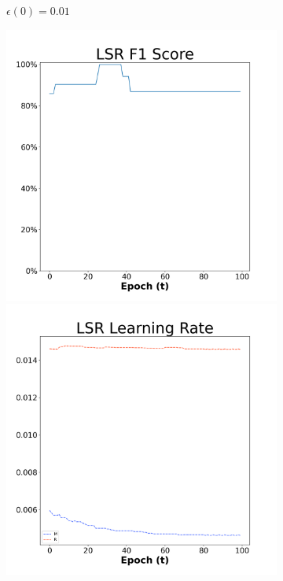\begin{figure}[H]
\begin{subfigure}{0.3\textwidth}
  \caption{$\epsilon(0)=0.01$}
\end{subfigure}\hfil %
\begin{subfigure}{0.3\textwidth}
  \includegraphics[width=\linewidth]{images/exper2/Sonar/LSR_0.03_f1.png}
  \includegraphics[width=\linewidth]{images/exper2/Sonar/LSR_0.03_lr.png}

\end{subfigure}
\end{figure}

